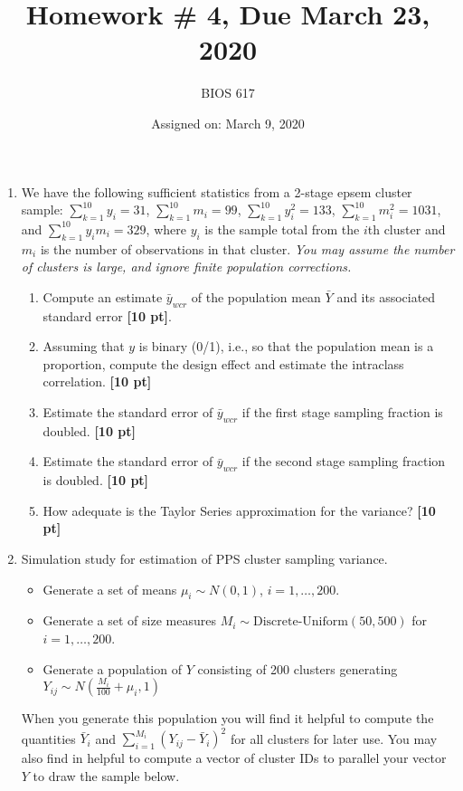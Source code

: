 \documentclass[12pt]{article}
\begin{document}
\title{Homework \# 4, Due March 23, 2020}
\author{BIOS 617}
\date{Assigned on: March 9, 2020}

\maketitle

\begin{enumerate}
\setlength{\itemsep}{15pt}%
\setlength{\parskip}{15pt}%

\item  We have the following sufficient statistics from a 2-stage epsem cluster sample: $\sum_{k=1}^10 y_i = 31$, $\sum_{k=1}^10 m_i = 99$, $\sum_{k=1}^10 y_i^2 = 133$, $\sum_{k=1}^10 m_i^2 = 1031$, and $\sum_{k=1}^10 y_i m_i = 329$, where $y_i$ is the sample total from the $i$th cluster and $m_i$ is the number of observations in that cluster.  {\it You may assume the number of clusters is large, and ignore finite population corrections.}
	\begin{enumerate}[itemsep=5ex]
	\item Compute an estimate $\bar y_{wcr}$ of the population mean $\bar Y$ and its associated standard error {\bf [10 pt]}.
	\item Assuming that $y$ is binary (0/1), i.e., so that the population mean is a proportion, compute the design effect and estimate the intraclass correlation. {\bf [10 pt]}
	\item Estimate the standard error of $\bar y_{wcr}$ if the first stage sampling fraction is doubled. {\bf [10 pt]}
	\item Estimate the standard error of $\bar y_{wcr}$ if the second stage sampling fraction is doubled. {\bf [10 pt]}
	\item How adequate is the Taylor Series approximation for the variance? {\bf [10 pt]}
	\end{enumerate}
	\pagebreak

\item  Simulation study for estimation of PPS cluster sampling variance.
\begin{itemize}
\item Generate a set of means $\mu_i \sim N(0,1)$, $i=1,\ldots,200$.
\item Generate a set of size measures $M_i \sim \text{Discrete-Uniform} (50,500)$ for $i=1,\ldots,200$.
\item Generate a population of $Y$ consisting of 200 clusters generating $Y_{ij} \sim N \left( \frac{M_i}{100} + \mu_i, 1 \right)$
\end{itemize}
When you generate this population you will find it helpful to compute the quantities $\bar Y_i$ and $\sum_{i=1}^{M_i} (Y_{ij} - \bar Y_i)^2$ for all clusters for later use.  You may also find in helpful to compute a vector of cluster IDs to parallel your vector $Y$ to draw the sample below.




\end{enumerate}
\end{document}
